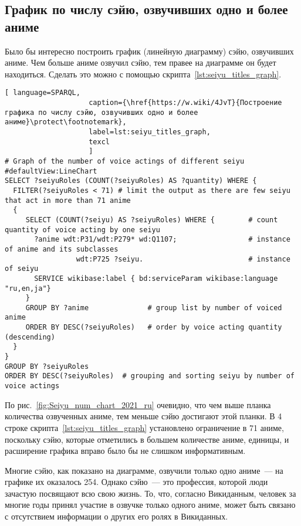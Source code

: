 \subsection{График по числу сэйю, озвучивших одно и более аниме}

Было бы интересно построить график (линейную диаграмму) сэйю, озвучивших аниме. Чем больше аниме озвучил сэйю, тем правее на диаграмме он будет находиться. Сделать это можно с помощью скрипта~\ref{lst:seiyu_titles_graph}.

\begin{fullwidth}
\lstset{numbers=left, firstnumber=1, frame=single}
\begin{lstlisting}[ language=SPARQL, 
                    caption={\href{https://w.wiki/4JvT}{Построение графика по числу сэйю, озвучивших одно и более аниме}\protect\footnotemark},
                    label=lst:seiyu_titles_graph,
                    texcl 
                    ]
# Graph of the number of voice actings of different seiyu
#defaultView:LineChart
SELECT ?seiyuRoles (COUNT(?seiyuRoles) AS ?quantity) WHERE {
  FILTER(?seiyuRoles < 71) # limit the output as there are few seiyu that act in more than 71 anime
  {
     SELECT (COUNT(?seiyu) AS ?seiyuRoles) WHERE {        # count quantity of voice acting by one seiyu
       ?anime wdt:P31/wdt:P279* wd:Q1107;                 # instance of anime and its subclasses
                 wdt:P725 ?seiyu.                         # instance of seiyu
       SERVICE wikibase:label { bd:serviceParam wikibase:language "ru,en,ja"}
     }
     GROUP BY ?anime              # group list by number of voiced anime
     ORDER BY DESC(?seiyuRoles)   # order by voice acting quantity (descending)
  }
}
GROUP BY ?seiyuRoles
ORDER BY DESC(?seiyuRoles)  # grouping and sorting seiyu by number of voice actings
\end{lstlisting}%
\lstset{numbers=none}
\end{fullwidth}

По рис.~\ref{fig:Seiyu_num_chart_2021_ru} очевидно, что чем выше планка количества озвученных аниме, тем меньше сэйю достигают этой планки. В \num{4} строке скрипта~\ref{lst:seiyu_titles_graph} установлено ограничение в \num{71} аниме, поскольку сэйю, которые отметились в большем количестве аниме, единицы, и расширение графика вправо было бы не слишком информативным.

Многие сэйю, как показано на диаграмме, озвучили только одно аниме~--- на графике их оказалось \num{254}. Однако сэйю~--- это профессия, которой люди зачастую посвящают всю свою жизнь. То, что, согласно Викиданным, человек за многие годы принял участие в озвучке только одного аниме, может быть связано с отсутствием информации о других его ролях в Викиданных. 

